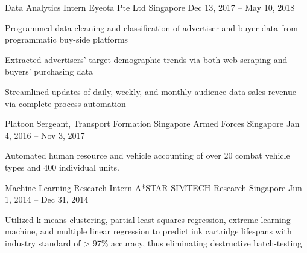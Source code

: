 \begin{cventries}
  \cventry
    {Data Analytics Intern} %
    {Eyeota Pte Ltd } %
    {Singapore} %
    {Dec 13, 2017 – May 10, 2018} %
    {
      \begin{cvitems} %
        \item {Programmed data cleaning and classification of advertiser and buyer data from programmatic buy-side platforms}
        \item {Extracted advertisers’ target demographic trends via both web-scraping and buyers’ purchasing data}
        \item {Streamlined updates of daily, weekly, and monthly audience data sales revenue via complete process automation}
      \end{cvitems}
    }

  \cventry
    {Platoon Sergeant, Transport Formation} %
    {Singapore Armed Forces} %
    {Singapore} %
    {Jan 4, 2016 – Nov 3, 2017} %
    {
      \begin{cvitems} %
        \item {Automated human resource and vehicle accounting of over 20 combat vehicle types and 400 individual units.}
      \end{cvitems}
    }

  \cventry
    {Machine Learning Research Intern} %
    {A*STAR SIMTECH Research} %
    {Singapore} %
    {Jun 1, 2014 – Dec 31, 2014} %
    {
      \begin{cvitems} %
        \item {Utilized k-means clustering, partial least squares regression, extreme learning machine, and multiple linear regression to predict ink cartridge lifespans with industry standard of > 97\% accuracy, thus eliminating destructive batch-testing}
      \end{cvitems}
    }

\end{cventries}
